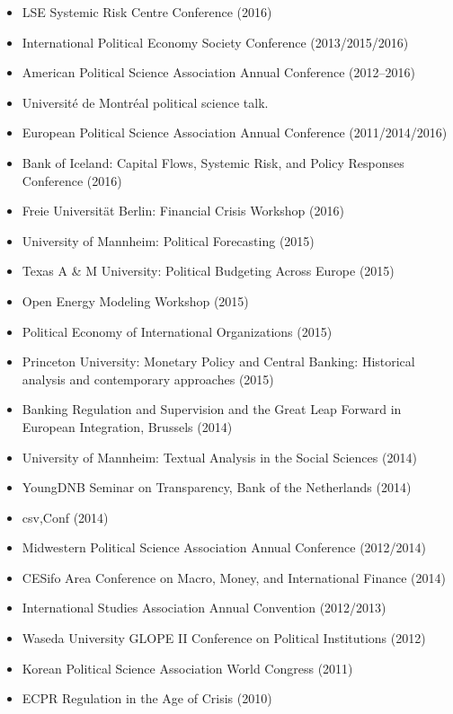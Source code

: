 \documentclass[a4paper]{article}
\begin{document}
{\begin{itemize}
    \item LSE Systemic Risk Centre Conference (2016)
    \item International Political Economy Society Conference (2013/2015/2016)
    \item American Political Science Association Annual Conference (2012--2016)
    \item Universit\'{e} de Montr\'{e}al political science talk.
    \item European Political Science Association Annual Conference (2011/2014/2016)
    \item Bank of Iceland: Capital Flows, Systemic Risk, and Policy Responses Conference (2016)
    \item Freie Universit\"{a}t Berlin: Financial Crisis Workshop (2016)
    \item University of Mannheim: Political Forecasting (2015)
    \item Texas A \& M University: Political Budgeting Across Europe (2015)
    \item Open Energy Modeling Workshop (2015)
    \item Political Economy of International Organizations (2015)
    \item Princeton University: Monetary Policy and Central Banking: Historical analysis and contemporary approaches (2015)
    \item Banking Regulation and Supervision and the Great Leap Forward in European Integration, Brussels (2014)
    \item University of Mannheim: Textual Analysis in the Social Sciences (2014)
    \item YoungDNB Seminar on Transparency, Bank of the Netherlands (2014)
    \item csv,Conf (2014)
    \item Midwestern Political Science Association Annual Conference (2012/2014)
    \item CESifo Area Conference on Macro, Money, and International Finance (2014)
    \item International Studies Association Annual Convention (2012/2013)
    \item Waseda University GLOPE II Conference on Political Institutions (2012)
    \item Korean Political Science Association World Congress (2011)
    \item ECPR Regulation in the Age of Crisis (2010)
\end{itemize}


}
\end{document}
